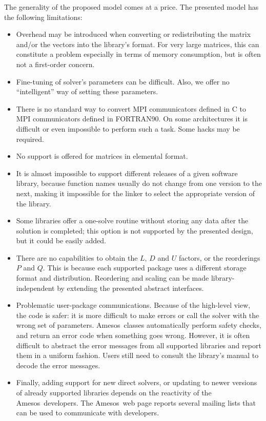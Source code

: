 \documentclass{llncs}
\newcommand{\amesos}{{\sc Amesos}}
\begin{document}
The generality of the proposed model comes at a price. The presented model has the following
limitations:
\begin{itemize}
\item
Overhead may be introduced when converting or redistributing the
matrix and/or the vectors into the library's format. For very large
matrices, this can constitute a problem especially in terms of
memory consumption, but is often not a first-order concern.
\item
Fine-tuning of solver's parameters can be difficult. Also, we offer no
``intelligent'' way of setting these parameters.  
%
\item There is no standard way to convert MPI communicators defined in C to
MPI communicators defined in FORTRAN90. On some architectures it is difficult
or even impossible to perform such a task. Some hacks may be required.
%
\item
No support is offered for matrices in elemental format.
\item
It is almost impossible to support different releases of a given
software library, because function names usually do not change from
one version to the next, making it impossible for the linker to
select the
  appropriate version of the library.
%
\item
Some libraries offer a one-solve routine without storing any data after the
solution is completed; this option is not  supported
by the presented design, but it could be easily added.
%
\item
There are no capabilities to obtain the $L$, $D$ and $U$ factors, or the
reorderings $P$ and $Q$. This is because each supported package uses a
different storage format and distribution. Reordering and scaling can be made
library-independent by extending the presented abstract interfaces.
%
\item
Problematic user-package communications. Because of the high-level view, the
code is safer: it is more difficult to make errors or call the solver with the
wrong set of parameters. \amesos\ classes automatically perform safety checks,
      and return an error code when something goes wrong. However,
it is often difficult to abstract the error
messages from all supported libraries and report them in a uniform fashion.
Users still need to consult the library's manual to decode the error messages.
\item
Finally, adding support for new direct
solvers, or updating to newer versions of already supported libraries
depends on the reactivity of the \amesos\ developers. The \amesos\ web page
reports several mailing lists that can be used to communicate with developers.
%
\end{itemize}
\end{document}
